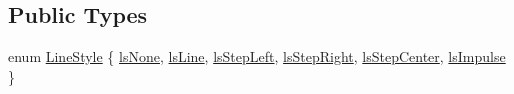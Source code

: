 \subsection*{Public Types}
\begin{DoxyCompactItemize}
\item 
enum \hyperlink{classQCPGraph_ad60175cd9b5cac937c5ee685c32c0859}{Line\+Style} \{ \newline
\hyperlink{classQCPGraph_ad60175cd9b5cac937c5ee685c32c0859aea9591b933733cc7b20786b71e60fa04}{ls\+None}, 
\hyperlink{classQCPGraph_ad60175cd9b5cac937c5ee685c32c0859a3c42a27b15aa3c92d399082fad8b7515}{ls\+Line}, 
\hyperlink{classQCPGraph_ad60175cd9b5cac937c5ee685c32c0859ae10568bda57836487d9dec5eba1d6c6e}{ls\+Step\+Left}, 
\hyperlink{classQCPGraph_ad60175cd9b5cac937c5ee685c32c0859a9c37951f7d11aa070100fd16f2935c9e}{ls\+Step\+Right}, 
\newline
\hyperlink{classQCPGraph_ad60175cd9b5cac937c5ee685c32c0859a5adf7b04da215a40a764c21294ea7366}{ls\+Step\+Center}, 
\hyperlink{classQCPGraph_ad60175cd9b5cac937c5ee685c32c0859aa3b358b4ae7cca94aceeb8e529c12ebb}{ls\+Impulse}
 \}
\end{DoxyCompactItemize}

